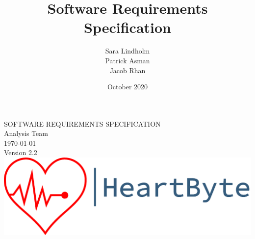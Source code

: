 \documentclass{scrreprt}
\title{Software Requirements Specification}
\author{Sara Lindholm \\ Patrick Asman \\ Jacob Rhan}
\date{October 2020}
\def\myversion{2.2}
\begin{document}
\begin{titlepage}
    \begin{center}
    \begin{bfseries}
        \Huge{SOFTWARE REQUIREMENTS SPECIFICATION}\\
        \vspace{1.5cm}
        \LARGE Analysis Team \\
        \vspace{1.5cm}
        \today\\
        \vspace{1.5cm}
        {Version \myversion}\\
        \vfill
        \includegraphics[width=\linewidth]{Pictures/logo.png} \\
    \end{bfseries}
    \end{center}
\end{titlepage}
\end{document}
